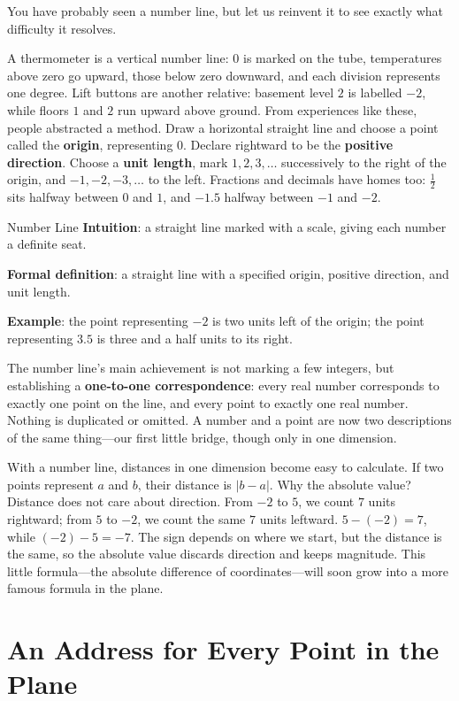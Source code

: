You have probably seen a number line, but let us reinvent it to see exactly what difficulty it resolves.

A thermometer is a vertical number line: $0$ is marked on the tube, temperatures above zero go upward, those below zero downward, and each division represents one degree. Lift buttons are another relative: basement level $2$ is labelled $-2$, while floors $1$ and $2$ run upward above ground. From experiences like these, people abstracted a method. Draw a horizontal straight line and choose a point called the \textbf{origin}, representing $0$. Declare rightward to be the \textbf{positive direction}. Choose a \textbf{unit length}, mark $1,2,3,\dots$ successively to the right of the origin, and $-1,-2,-3,\dots$ to the left. Fractions and decimals have homes too: $\frac{1}{2}$ sits halfway between $0$ and $1$, and $-1.5$ halfway between $-1$ and $-2$.

\begin{shuyu}{Number Line}
\textbf{Intuition}: a straight line marked with a scale, giving each number a definite seat.

\textbf{Formal definition}: a straight line with a specified origin, positive direction, and unit length.

\textbf{Example}: the point representing $-2$ is two units left of the origin; the point representing $3.5$ is three and a half units to its right.
\end{shuyu}

The number line's main achievement is not marking a few integers, but establishing a \textbf{one-to-one correspondence}: every real number corresponds to exactly one point on the line, and every point to exactly one real number. Nothing is duplicated or omitted. A number and a point are now two descriptions of the same thing---our first little bridge, though only in one dimension.

With a number line, distances in one dimension become easy to calculate. If two points represent $a$ and $b$, their distance is $\lvert b-a\rvert$. Why the absolute value? Distance does not care about direction. From $-2$ to $5$, we count $7$ units rightward; from $5$ to $-2$, we count the same $7$ units leftward. $5-(-2)=7$, while $(-2)-5=-7$. The sign depends on where we start, but the distance is the same, so the absolute value discards direction and keeps magnitude. This little formula---the absolute difference of coordinates---will soon grow into a more famous formula in the plane.

\section{An Address for Every Point in the Plane}


